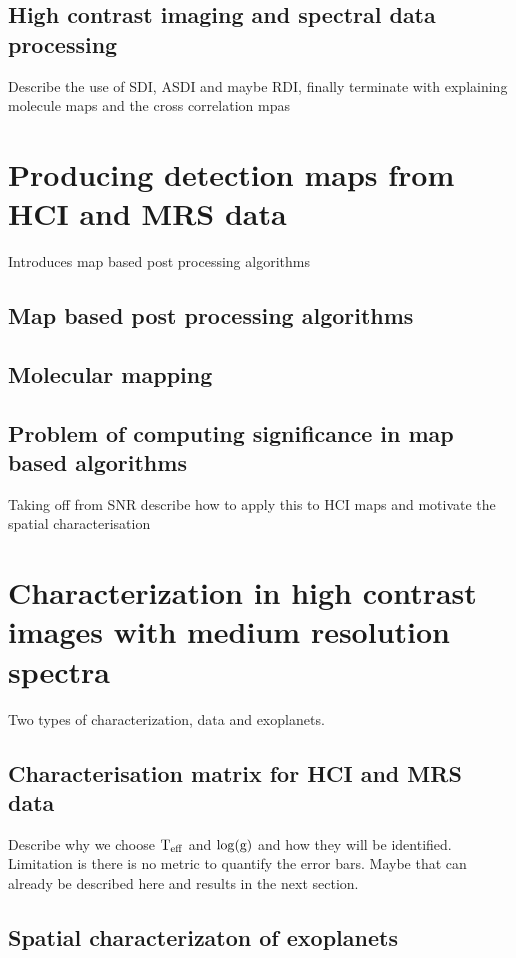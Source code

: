\section{High contrast imaging and spectral data processing}
Describe the use of SDI, ASDI and maybe RDI, finally terminate with explaining molecule maps and the cross correlation mpas
\chapter{Producing detection maps from HCI and MRS data}
Introduces map based post processing algorithms
\section{Map based post processing algorithms}
\section{Molecular mapping }
\section{Problem of computing significance in map based algorithms}
Taking off from SNR describe how to apply this to HCI maps and motivate the spatial characterisation
\chapter{Characterization in high contrast images with medium resolution spectra}
Two types of characterization, data and exoplanets.
\section{Characterisation matrix for HCI and MRS data}
Describe why we choose $\rm{T_{eff}}$ and $\log(\rm{g})$ and how they will be identified. 
Limitation is there is no metric to quantify the error bars. Maybe that can already be described here and results in the next section.
\section{Spatial characterizaton of exoplanets}
